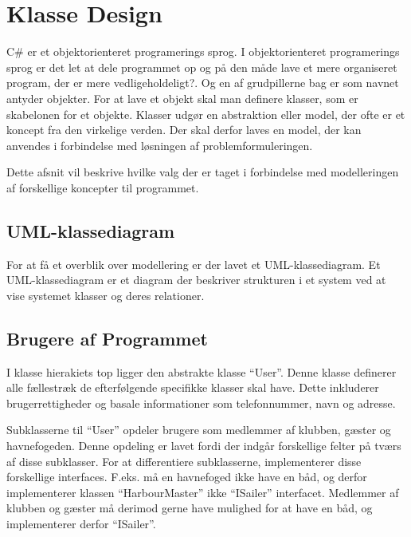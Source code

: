 \section{Klasse Design}
\label{sec:klasse_design}
C\# er et objektorienteret programerings sprog. I objektorienteret programerings sprog er det let at dele programmet op og på den måde lave et mere organiseret program, der er mere vedligeholdeligt?. Og en af grudpillerne bag er som navnet antyder objekter. For at lave et objekt skal man definere klasser, som er skabelonen for et objekte. Klasser udgør en abstraktion eller model, der ofte er et koncept fra den virkelige verden. Der skal derfor laves en model, der kan anvendes i forbindelse med løsningen af problemformuleringen.

Dette afsnit vil beskrive hvilke valg der er taget i forbindelse med modelleringen af forskellige koncepter til programmet.

\subsection{UML-klassediagram}
For at få et overblik over modellering er der lavet et UML-klassediagram. Et UML-klassediagram er et diagram der beskriver strukturen i et system ved at vise systemet klasser og deres relationer.



\subsection{Brugere af Programmet}
\label{sub:brugere_af_programmet}

I klasse hierakiets top ligger den abstrakte klasse \enquote{User}. Denne klasse definerer alle fællestræk de efterfølgende specifikke klasser skal have. Dette inkluderer brugerrettigheder og basale informationer som telefonnummer, navn og adresse.

Subklasserne til \enquote{User} opdeler brugere som medlemmer af klubben, gæster og havnefogeden. Denne opdeling er lavet fordi der indgår forskellige felter på tværs af disse subklasser. For at differentiere subklasserne, implementerer disse forskellige interfaces. F.eks. må en havnefoged ikke have en båd, og derfor implementerer klassen \enquote{HarbourMaster} ikke \enquote{ISailer} interfacet. Medlemmer af klubben og gæster må derimod gerne have mulighed for at have en båd, og implementerer derfor \enquote{ISailer}.

